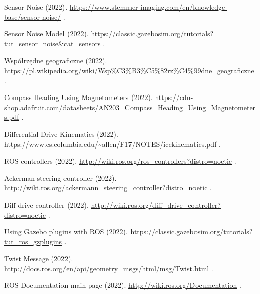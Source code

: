 \begin{thebibliography}{99}
    {Sensor Noise} (2022).
    \newblock \url{https://www.stemmer-imaging.com/en/knowledge-base/sensor-noise/}
    \newblock [Accessed: 11/11/2022].

    {Sensor Noise Model} (2022).
    \newblock \url{https://classic.gazebosim.org/tutorials?tut=sensor_noise&cat=sensors}
    \newblock [Accessed: 12/11/2022].

    {Współrzędne geograficzne} (2022).
    \newblock \url{https://pl.wikipedia.org/wiki/Wsp%C3%B3%C5%82rz%C4%99dne_geograficzne}
    \newblock [Accessed: 19/11/2022].

    {Compass Heading Using Magnetometers} (2022).
    \newblock \url{https://cdn-shop.adafruit.com/datasheets/AN203_Compass_Heading_Using_Magnetometers.pdf}
    \newblock [Accessed: 19/12/2022].

    {Differential Drive Kinematics} (2022).
    \newblock \url{https://www.cs.columbia.edu/~allen/F17/NOTES/icckinematics.pdf}
    \newblock [Accessed: 12/12/2022].

    {ROS controllers} (2022).
    \newblock \url{http://wiki.ros.org/ros_controllers?distro=noetic}
    \newblock [Accessed: 10/11/2022].

    {Ackerman steering controller} (2022).
    \newblock \url{http://wiki.ros.org/ackermann_steering_controller?distro=noetic}
    \newblock [Accessed: 11/11/2022].

    {Diff drive controller} (2022).
    \newblock \url{http://wiki.ros.org/diff_drive_controller?distro=noetic}
    \newblock [Accessed: 10/12/2022].

    {Using Gazebo plugins with ROS} (2022).
    \newblock \url{https://classic.gazebosim.org/tutorials?tut=ros_gzplugins}
    \newblock [Accessed: 10/12/2022].

    {Twist Message} (2022).
    \newblock \url{http://docs.ros.org/en/api/geometry_msgs/html/msg/Twist.html}
    \newblock [Accessed: 15/12/2022].

    {ROS Documentation main page} (2022).
    \newblock \url{http://wiki.ros.org/Documentation}
    \newblock [Accessed: 20/12/2022].


\end{thebibliography}
